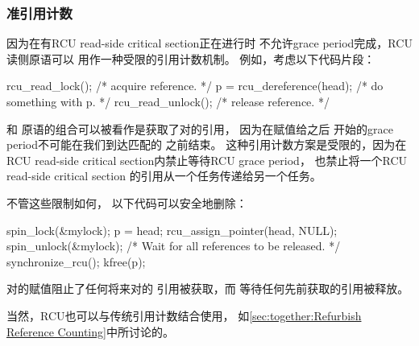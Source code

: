 \subsubsection{准引用计数}
\label{sec:defer:Quasi Reference Count}

因为在有RCU read-side critical section正在进行时
不允许grace period完成，RCU读侧原语可以
用作一种受限的引用计数机制。
例如，考虑以下代码片段：

\begin{VerbatimN}
rcu_read_lock();  /* acquire reference. */
p = rcu_dereference(head);
/* do something with p. */
rcu_read_unlock();  /* release reference. */
\end{VerbatimN}

和
原语的组合可以被看作是获取了对的引用，
因为在赋值给之后
开始的grace period不可能在我们到达匹配的
之前结束。
这种引用计数方案是受限的，因为在RCU read-side
critical section内禁止等待RCU grace period，
也禁止将一个RCU read-side critical section
的引用从一个任务传递给另一个任务。

不管这些限制如何，
以下代码可以安全地删除：

\begin{VerbatimN}
spin_lock(&mylock);
p = head;
rcu_assign_pointer(head, NULL);
spin_unlock(&mylock);
/* Wait for all references to be released. */
synchronize_rcu();
kfree(p);
\end{VerbatimN}

对的赋值阻止了任何将来对的
引用被获取，而
等待任何先前获取的引用被释放。

\QuickQuizEnd

当然，RCU也可以与传统引用计数结合使用，
如\cref{sec:together:Refurbish Reference Counting}中所讨论的。

